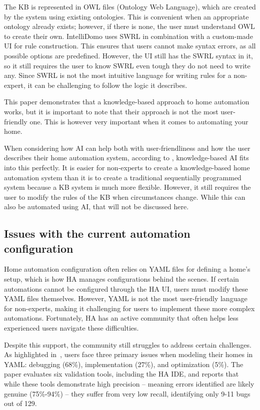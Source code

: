 \documentclass[11pt,a4paper]{report}
\begin{document}
The KB is represented in OWL files (Ontology Web Language), which are created by the system using existing ontologies. This is convenient when an appropriate ontology already exists; however, if there is none, the user must understand OWL to create their own. IntelliDomo uses SWRL in combination with a custom-made UI for rule construction. This ensures that users cannot make syntax errors, as all possible options are predefined. However, the UI still has the SWRL syntax in it, so it still requires the user to know SWRL even tough they do not need to write any. Since SWRL is not the most intuitive language for writing rules for a non-expert, it can be challenging to follow the logic it describes.

This paper demonstrates that a knowledge-based approach to home automation works, but it is important to note that their approach is not the most user-friendly one. This is however very important when it comes to automating your home.

When considering how AI can help both with user-friendliness and how the user describes their home automation system, according to \cite{SOTA_KnowledgeBasedAIInHomeAutomation}, knowledge-based AI fits into this perfectly. It is easier for non-experts to create a knowledge-based home automation system than it is to create a traditional sequentially programmed system because a KB system is much more flexible. However, it still requires the user to modify the rules of the KB when circumstances change. While this can also be automated using AI, that will not be discussed here.

\subsection{Issues with the current automation configuration}
Home automation configuration often relies on YAML files for defining a home's setup, which is how HA manages configurations behind the scenes. If certain automations cannot be configured through the HA UI, users must modify these YAML files themselves. However, YAML is not the most user-friendly language for non-experts, making it challenging for users to implement these more complex automations. Fortunately, HA has an active community that often helps less experienced users navigate these difficulties.

Despite this support, the community still struggles to address certain challenges. As highlighted in~\cite{SOTA_AutomationConfigurationSmarthome}, users face three primary issues when modeling their homes in YAML: debugging (68\%), implementation (27\%), and optimization (5\%). The paper evaluates six validation tools, including the HA IDE, and reports that while these tools demonstrate high precision -- meaning errors identified are likely genuine (75\%-94\%) -- they suffer from very low recall, identifying only 9-11 bugs out of 129.
\end{document}
